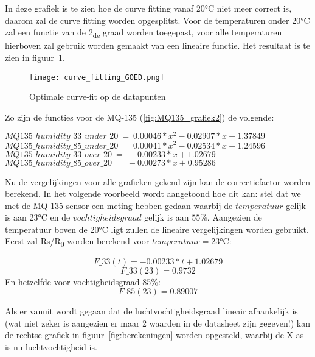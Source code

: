 In deze grafiek is te zien hoe de curve fitting vanaf 20°C niet meer correct is, daarom zal de curve fitting worden opgesplitst. Voor de temperaturen onder 20°C zal een functie van de 2\textsubscript{de} graad worden toegepast, voor alle temperaturen hierboven zal gebruik worden gemaakt van een lineaire functie. Het resultaat is te zien in figuur~\ref{fig:curve_fitting_GOED}.

\begin{figure}[!h]
    \texttt{[image: curve\_fitting\_GOED.png]}
    \caption[Optimale curve-fit op de datapunten]{Optimale curve-fit op de datapunten}
    \label{fig:curve_fitting_GOED}
\end{figure}

Zo zijn de functies voor de MQ-135 (\ref{fig:MQ135_grafiek2}) de volgende:

\(MQ135\_humidity\_33\_under\_20\ =\ 0.00046 * x^2 - 0.02907 * x + 1.37849\) \\
\(MQ135\_humidity\_85\_under\_20\ =\ 0.00041 * x^2 - 0.02534 * x + 1.24596\) \\
\(MQ135\_humidity\_33\_over\_20\ =\ -0.00233 * x + 1.02679\) \\
\(MQ135\_humidity\_85\_over\_20\ =\ -0.00273 * x + 0.95286\)

Nu de vergelijkingen voor alle grafieken gekend zijn kan de correctiefactor worden berekend. In het volgende voorbeeld wordt aangetoond hoe dit kan: stel dat we met de MQ-135 sensor een meting hebben gedaan waarbij de $temperatuur$ gelijk is aan $23$°C en de $vochtigheidsgraad$ gelijk is aan $55\%$. Aangezien de temperatuur boven de 20°C ligt zullen de lineaire vergelijkingen worden gebruikt.
Eerst zal Rs/R\textsubscript{0} worden berekend voor $temperatuur = 23$°C:

\begin{equation}
    F\_33(t) = -0.00233 * t + 1.02679
\end{equation}
\begin{equation}
    F\_33(23) = 0.9732
\end{equation}
En hetzelfde voor vochtigheidsgraad 85\%:
\begin{equation}
    F\_85(23) = 0.89007
\end{equation}

Als er vanuit wordt gegaan dat de luchtvochtigheidsgraad lineair afhankelijk is (wat niet zeker is aangezien er maar 2 waarden in de datasheet zijn gegeven!) kan de rechtse grafiek in figuur~\ref{fig:berekeningen} worden opgesteld, waarbij de X-as is nu luchtvochtigheid is.

